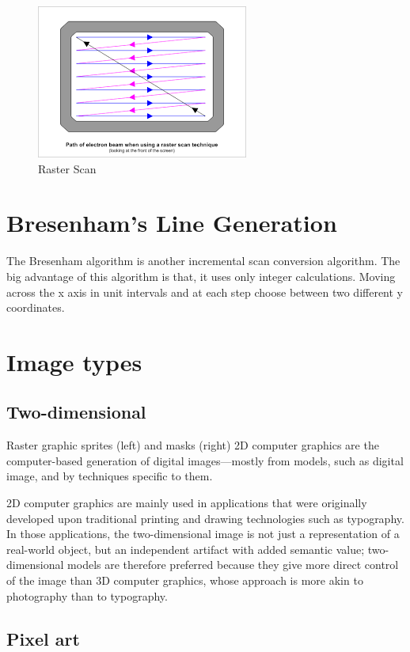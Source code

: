 \documentclass[a4paper]{article}
\begin{document}
 
 \begin{figure}[h]
 \centering
\includegraphics{rs}
\caption{Raster Scan}
\end{figure}
 
  \section{Bresenham’s Line Generation}
The Bresenham algorithm is another incremental scan conversion algorithm. The big advantage of this algorithm is that, it uses only integer calculations. Moving across the x axis in unit intervals and at each step choose between two different y coordinates.
 
   \newpage
  \section{Image types}
  \subsection{Two-dimensional}

Raster graphic sprites (left) and masks (right)
2D computer graphics are the computer-based generation of digital images—mostly from models, such as digital image, and by techniques specific to them.

2D computer graphics are mainly used in applications that were originally developed upon traditional printing and drawing technologies such as typography. In those applications, the two-dimensional image is not just a representation of a real-world object, but an independent artifact with added semantic value; two-dimensional models are therefore preferred because they give more direct control of the image than 3D computer graphics, whose approach is more akin to photography than to typography.
  \subsection{Pixel art}
  
\end{document}
